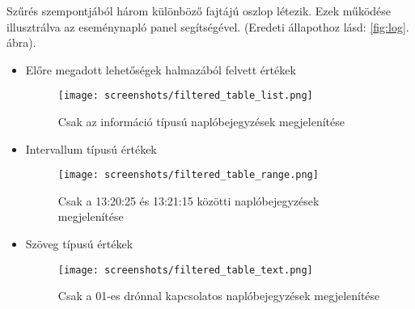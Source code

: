 Szűrés szempontjából három különböző fajtájú oszlop létezik.
Ezek működése illusztrálva az eseménynapló panel segítségével.
(Eredeti állapothoz lásd: \ref{fig:log}. ábra).

\begin{itemize}
  \item Előre megadott lehetőségek halmazából felvett értékek
  \begin{figure}[H]
    \center
    \texttt{[image: screenshots/filtered\_table\_list.png]}
    \caption{Csak az információ típusú naplóbejegyzések megjelenítése}
    \label{fig:filtered_table_list}
  \end{figure}

  \item Intervallum típusú értékek
  \begin{figure}[H]
    \center
    \texttt{[image: screenshots/filtered\_table\_range.png]}
    \caption{Csak a 13:20:25 és 13:21:15 közötti naplóbejegyzések megjelenítése}
    \label{fig:filtered_table_range}
  \end{figure}

  \item Szöveg típusú értékek
  \begin{figure}[H]
    \center
    \texttt{[image: screenshots/filtered\_table\_text.png]}
    \caption{Csak a 01-es drónnal kapcsolatos naplóbejegyzések megjelenítése}
    \label{fig:filtered_table_text}
  \end{figure}
\end{itemize}


